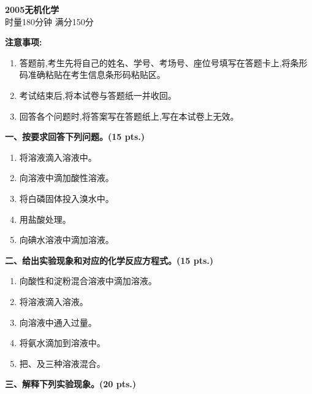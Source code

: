 \begin{center}
    {\LARGE \textbf{2005无机化学}} \\[2ex]
    {\large 时量180分钟 \quad 满分150分}
\end{center}

\vspace{0.5cm}
\noindent\textbf{注意事项:}
\begin{enumerate}[label=\arabic*., parsep=0pt, itemsep=0pt]
    \item 答题前,考生先将自己的姓名、学号、考场号、座位号填写在答题卡上,将条形码准确粘贴在考生信息条形码粘贴区。
    \item 考试结束后,将本试卷与答题纸一并收回。
    \item 回答各个问题时,将答案写在答题纸上,写在本试卷上无效。
\end{enumerate}

\vspace{0.5cm}
\noindent\textbf{一、按要求回答下列问题。(15 pts.)}

\begin{enumerate}[label=\arabic*., start=1, itemsep=1.5ex]
    \item 将溶液滴入溶液中。
    \item 向溶液中滴加酸性溶液。
    \item 将白磷固体投入溴水中。
    \item 用盐酸处理。
    \item 向碘水溶液中滴加溶液。
\end{enumerate}

\vspace{0.5cm}
\noindent\textbf{二、给出实验现象和对应的化学反应方程式。(15 pts.)}

\begin{enumerate}[label=\arabic*., start=1, itemsep=1.5ex]
    \item 向酸性和淀粉混合溶液中滴加溶液。
    \item 将溶液滴入溶液。
    \item 向溶液中通入过量。
    \item 将氨水滴加到溶液中。
    \item 把、及三种溶液混合。
\end{enumerate}

\vspace{0.5cm}
\noindent\textbf{三、解释下列实验现象。(20 pts.)}

